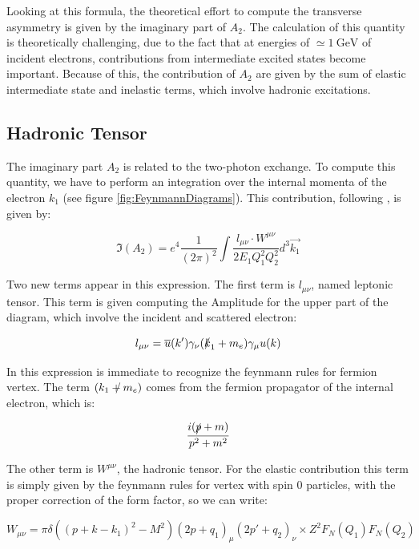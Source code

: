 Looking at this formula, the theoretical effort to compute the transverse asymmetry is given by the imaginary part of $A_{2}$. The calculation of this quantity is theoretically challenging, due to the fact that at energies of $\simeq \SI{1}{\giga \electronvolt}$ of incident electrons, contributions from intermediate excited states become important. Because of this, the contribution of $A_{2}$ are given by the sum of elastic intermediate state and inelastic terms, which involve hadronic excitations.

\subsection{Hadronic Tensor}

The imaginary part $A_{2}$ is related to the two-photon exchange. To compute this quantity, we have to perform an integration over the internal momenta of the electron $k_{1}$ (see figure \ref{fig:FeynmannDiagrams}). This contribution, following \cite{Gorchtein_2008}, is given by:

\begin{equation}
\Im(A_{2}) = e^{4} \frac{1}{(2\pi)^{2}} \int \dfrac{l_{\mu \nu} \cdot W^{\mu \nu}}{2E_{1} Q_{1}^{2} Q_{2}^{2}} d^{3}\vec{k_{1}}
\end{equation}

Two new terms appear in this expression. The first term is $l_{\mu \nu}$, named leptonic tensor. This term is given computing the Amplitude for the upper part of the diagram, which involve the incident and scattered electron:

\begin{equation}
l_{\mu \nu} = \overline{u}(k') \gamma_{\nu} (\slashed{k}_{1} + m_{e}) \gamma_{\mu} u(k)
\end{equation}

In this expression is immediate to recognize the feynmann rules for fermion vertex. The term $(\slashed{k_{1} + m_{e}})$ comes from the fermion propagator of the internal electron, which is:

\begin{align*}
\dfrac{i(\slashed{p} + m)}{p^{2} + m^{2}}
\end{align*}

The other term is $W^{\mu \nu}$, the hadronic tensor. For the elastic contribution this term is simply given by the feynmann rules for vertex with spin 0 particles, with the proper correction of the form factor, so we can write:

\begin{equation}
W_{\mu \nu} = \pi \delta((p + k - k_{1})^{2} - M^{2}) (2p + q_{1})_{\mu} (2p' + q_{2})_{\nu} \times Z^{2} F_{N}(Q_{1})  F_{N}(Q_{2})
\end{equation}

